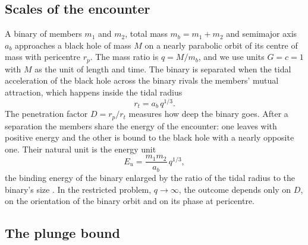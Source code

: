 \documentclass[aps,prd,twocolumn,10pt,superscriptaddress,nofootinbib,longbibliography,floatfix]{revtex4-2}
\newcommand{\rt}{r_t}
\newcommand{\rp}{r_p}
\newcommand{\mb}{m_b}
\newcommand{\Eu}{E_u}
\begin{document}
\subsection{Scales of the encounter}\label{sec:scales}

A binary of members $m_1$ and $m_2$, total mass $\mb=m_1+m_2$ and semimajor axis $a_b$ approaches a black hole of mass $M$ on a nearly parabolic orbit of its centre of mass with pericentre $\rp$. The mass ratio is $q=M/\mb$, and we use units $G=c=1$ with $M$ as the unit of length and time. The binary is separated when the tidal acceleration of the black hole across the binary rivals the members' mutual attraction, which happens inside the tidal radius
\begin{equation}\label{eq:rt}
\rt=a_b\,q^{1/3}.
\end{equation}
The penetration factor $D=\rp/\rt$ measures how deep the binary goes. After a separation the members share the energy of the encounter: one leaves with positive energy and the other is bound to the black hole with a nearly opposite one. Their natural unit is the energy unit
\begin{equation}\label{eq:Eu}
\Eu=\frac{m_1m_2}{a_b}\,q^{1/3},
\end{equation}
the binding energy of the binary enlarged by the ratio of the tidal radius to the binary's size \cite{Sari:2010hills}. In the restricted problem, $q\to\infty$, the outcome depends only on $D$, on the orientation of the binary orbit and on its phase at pericentre.

\subsection{The plunge bound}\label{sec:plunge}
\end{document}
